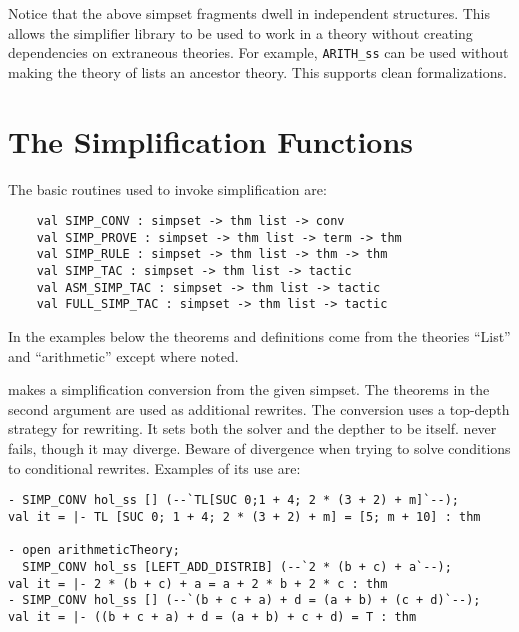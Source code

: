 
Notice that the above simpset fragments dwell in independent
structures. This allows the simplifier library to be used to work in a
theory without creating dependencies on extraneous theories. For
example, {\tt ARITH\_ss} can be used without making the theory of lists
an ancestor theory. This supports clean formalizations.

\section{The Simplification Functions}

The basic routines used to invoke simplification are:
\begin{boxed} \begin{verbatim}
    val SIMP_CONV : simpset -> thm list -> conv
    val SIMP_PROVE : simpset -> thm list -> term -> thm
    val SIMP_RULE : simpset -> thm list -> thm -> thm
    val SIMP_TAC : simpset -> thm list -> tactic
    val ASM_SIMP_TAC : simpset -> thm list -> tactic
    val FULL_SIMP_TAC : simpset -> thm list -> tactic
\end{verbatim} \end{boxed}

In the examples below the theorems and definitions come from the
theories ``List'' and ``arithmetic'' except where noted.

 makes a simplification conversion from the given
simpset.  The theorems in the second argument are used as additional
rewrites. The conversion uses a top-depth strategy for rewriting. It
sets both the solver and the depther to be  itself.
 never fails, though it may diverge.  Beware of
divergence when trying to solve conditions to conditional rewrites.
Examples of its use are:
\begin{verbatim}
- SIMP_CONV hol_ss [] (--`TL[SUC 0;1 + 4; 2 * (3 + 2) + m]`--);
val it = |- TL [SUC 0; 1 + 4; 2 * (3 + 2) + m] = [5; m + 10] : thm

- open arithmeticTheory;
  SIMP_CONV hol_ss [LEFT_ADD_DISTRIB] (--`2 * (b + c) + a`--);
val it = |- 2 * (b + c) + a = a + 2 * b + 2 * c : thm
- SIMP_CONV hol_ss [] (--`(b + c + a) + d = (a + b) + (c + d)`--);
val it = |- ((b + c + a) + d = (a + b) + c + d) = T : thm
\end{verbatim}

